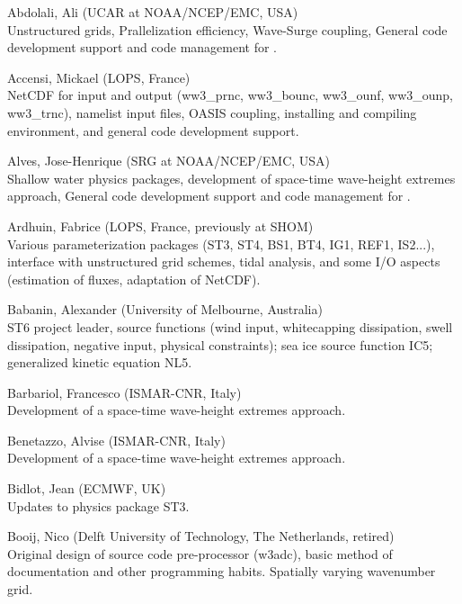 \begin{list}{\ldots}{ }

\item [Abdolali, Ali] (UCAR at NOAA/NCEP/EMC, USA) \\
  Unstructured grids, Prallelization efficiency, Wave-Surge coupling, General code development support and code management for \ws.

\item [Accensi, Mickael] (LOPS, France) \\
  NetCDF for input and output (ww3\_prnc, ww3\_bounc, ww3\_ounf, ww3\_ounp, ww3\_trnc), namelist input files, OASIS coupling, installing and compiling environment, and general code development support.

\item [Alves, Jose-Henrique] (SRG at NOAA/NCEP/EMC, USA) \\
  Shallow water physics packages, development of space-time wave-height extremes approach, General code development support and code management for \ws.

\item [Ardhuin, Fabrice] (LOPS, France, previously at SHOM) \\
  Various parameterization packages (ST3, ST4, BS1, BT4, IG1, REF1, IS2...), interface with unstructured grid schemes, tidal analysis, and some I/O aspects (estimation of fluxes, adaptation of NetCDF). 

\item [Babanin, Alexander] (University of Melbourne, Australia)\\
  ST6 project leader, source functions (wind input, whitecapping dissipation, swell dissipation, negative input, physical constraints); sea ice source function IC5; generalized kinetic equation NL5.

\item [Barbariol, Francesco] (ISMAR-CNR, Italy) \\
  Development of a space-time wave-height extremes approach.

\item [Benetazzo, Alvise] (ISMAR-CNR, Italy) \\
  Development of a space-time wave-height extremes approach.

\item [Bidlot, Jean] (ECMWF, UK) \\
  Updates to physics package ST3.

\item [Booij, Nico] (Delft University of Technology, The Netherlands, retired) \\
  Original design of source code pre-processor ({\code w3adc}), basic method
  of documentation and other programming habits. Spatially varying wavenumber
  grid.


\end{list}
